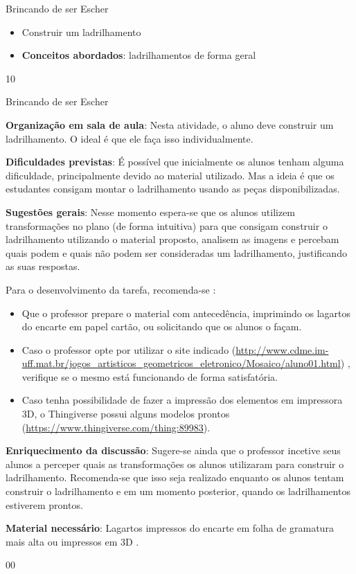 \clearmargin
\begin{objectives}{Brincando de ser Escher}
{
	\begin{itemize}
		\item Construir um ladrilhamento
		\item \textbf{Conceitos abordados}: ladrilhamentos de forma geral
	\end{itemize}	
}{1}{0}
\end{objectives}
\begin{sugestions}{Brincando de ser Escher}
{
	\textbf{Organização em sala de aula}: Nesta atividade, o aluno deve construir um ladrilhamento. O ideal é que ele faça isso individualmente. 

	\textbf{Dificuldades previstas}: É possível que inicialmente os alunos tenham alguma dificuldade, principalmente devido ao material utilizado. Mas a ideia é que os estudantes consigam montar o ladrilhamento usando as peças disponibilizadas.

	\textbf{Sugestões gerais}: Nesse momento espera-se que os alunos utilizem transformações no plano (de forma intuitiva) para que consigam construir o ladrilhamento utilizando o material proposto, analisem as imagens e percebam quais podem e quais não podem ser consideradas um ladrilhamento, justificando as suas respostas.

	Para o desenvolvimento da tarefa, recomenda-se : 
	\begin{itemize}
	\item Que o professor prepare o material com antecedência, imprimindo os lagartos do encarte em papel cartão, ou solicitando que os alunos o façam. 
	\item Caso o professor opte por utilizar o site indicado (\url{http://www.cdme.im-uff.mat.br/jogos_artisticos_geometricos_eletronico/Mosaico/aluno01.html}) , verifique se o mesmo está funcionando de forma satisfatória. 
	\item Caso tenha possibilidade de fazer a impressão dos elementos em impressora 3D, o Thingiverse possui alguns modelos prontos (\url{https://www.thingiverse.com/thing:89983}).
	\end{itemize}
 
	\textbf{Enriquecimento da discussão}: Sugere-se ainda que o professor incetive seus alunos a perceper quais as transformações os alunos utilizaram para construir o ladrilhamento. Recomenda-se que isso seja realizado enquanto os alunos tentam construir o ladrilhamento e em um momento posterior, quando os ladrilhamentos estiverem prontos.

	\textbf{Material necessário}: Lagartos impressos do encarte em folha de gramatura mais alta ou impressos em 3D .
}{0}{0}
\end{sugestions}
